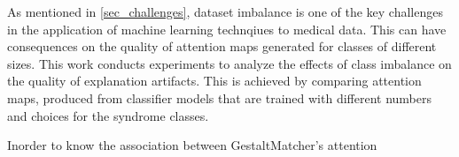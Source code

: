 \documentclass[../report.tex]{subfiles}
\begin{document}
 	As mentioned in \ref{sec_challenges}, dataset imbalance is one of the key challenges in the application of machine learning technqiues to medical data. This can have consequences on the quality of attention maps generated for classes of different sizes. This work conducts experiments to analyze the effects of class imbalance on the quality of explanation artifacts. This is achieved by comparing attention maps, produced from classifier models that are trained with different numbers and choices for the syndrome classes. 
 	
 	Inorder to know the association between GestaltMatcher's attention   
 	
\end{document}
